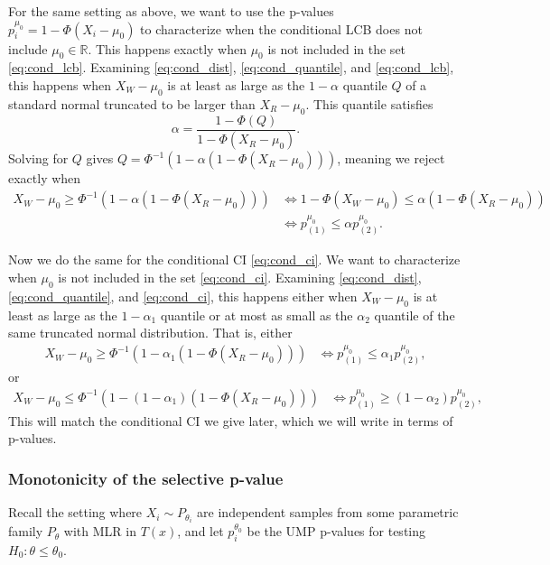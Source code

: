 \documentclass{article}
\newcommand{\R}{\mathbb{R}}
\begin{document}
\begin{appendix}
For the same setting as above, we want to use the p-values $p^{\mu_0}_i = 1 - \Phi(X_i - \mu_0)$ to characterize when the conditional LCB does not include $\mu_0 \in \R$. This happens exactly when $\mu_0$ is not included in the set \eqref{eq:cond_lcb}. Examining \eqref{eq:cond_dist}, \eqref{eq:cond_quantile}, and \eqref{eq:cond_lcb}, this happens when $X_W - \mu_0$ is at least as large as the $1-\alpha$ quantile $Q$ of a standard normal truncated to be larger than $X_R - \mu_0$. This quantile satisfies 
    \begin{equation*}
        \alpha = \frac{1 - \Phi(Q) }{1 - \Phi(X_R - \mu_0) }.
    \end{equation*}
Solving for $Q$ gives $Q = \Phi^{-1}(1 - \alpha(1 - \Phi(X_R - \mu_0)))$, meaning we reject exactly when 
\begin{align*}
    X_{W} - \mu_0 \geq \Phi^{-1}(1 - \alpha(1 - \Phi(X_{R} - \mu_0))) &\iff 1 - \Phi(X_{W} - \mu_0) \leq \alpha(1 - \Phi(X_{R} - \mu_0))\\
    &\iff p^{\mu_0}_{(1)} \leq \alpha p^{\mu_0}_{(2)}.
\end{align*}

Now we do the same for the conditional CI \eqref{eq:cond_ci}. We want to characterize when $\mu_0$ is not included in the set \eqref{eq:cond_ci}. Examining \eqref{eq:cond_dist}, \eqref{eq:cond_quantile}, and \eqref{eq:cond_ci}, this happens either when $X_W - \mu_0$ is at least as large as the $1-\alpha_1$ quantile or at most as small as the $\alpha_2$ quantile of the same truncated normal distribution. That is, either 
\begin{align*}
    X_{W} - \mu_0 \geq \Phi^{-1}(1 - \alpha_1(1 - \Phi(X_{R} - \mu_0))) & \iff p^{\mu_0}_{(1)} \leq \alpha_1 p^{\mu_0}_{(2)},
\end{align*}
or 
\begin{align*}
    X_{W} - \mu_0 \leq \Phi^{-1}(1 - (1-\alpha_1)(1 - \Phi(X_{R} - \mu_0))) & \iff p^{\mu_0}_{(1)} \geq (1-\alpha_2) p^{\mu_0}_{(2)},
\end{align*}
This will match the conditional CI we give later, which we will write in terms of p-values.

\subsubsection{Monotonicity of the selective p-value}

Recall the setting where $X_i \sim P_{\theta_i}$ are independent samples from some parametric family $P_{\theta}$ with MLR in $T(x)$, and let $p^{\theta_0}_i$ be the UMP p-values for testing $H_0 : \theta \leq \theta_0$. 


\end{appendix}
\end{document}
